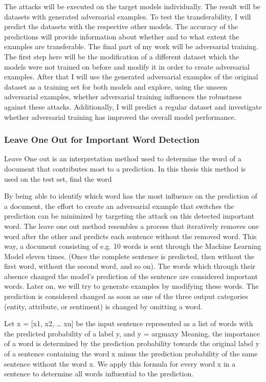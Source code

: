 The attacks will be executed on the target models individually.
The result will be datasets with generated adversarial examples. To test the transferability, I will predict the datasets with the respective other models. The accuracy of the predictions will provide information about whether and to what extent the examples are transferable.
The final part of my work will be adversarial training. 
The first step here will be the modification of a different dataset which the models were not trained on before and modify it in order to create adversarial examples. After that I will use the generated adversarial examples of the original dataset as a training set for both models and explore, using the unseen adversarial examples, whether adversarial training influences the robustness against these attacks. Additionally, I will predict a regular dataset and investigate whether adversarial training has improved the overall model performance.




\subsubsection{Leave One Out for Important Word Detection}

Leave One out is an interpretation method used to determine the word of a document that contributes most to a prediction. 
In this thesis this method is used on the test set, find the word 

By being able to identify which word has the most influence on the prediction of a document, the effort to create an adversarial example that switches the prediction can be minimized by targeting the attack on this detected important word.
The leave one out method resembles a process that iteratively removes one word after the other and predicts each sentence without the removed word. 
This way, a document consisting of e.g. 10 words is sent through the Machine Learning Model eleven times. (Once the complete sentence is predicted, then without the first word, without the second word, and so on).
The words which through their absence changed the model’s prediction of the sentence are considered important words. Later on, we will try to generate examples by modifying these words.
The prediction is considered changed as soon as one of the three output categories (entity, attribute, or sentiment) is changed by omitting a word.

Let x = [x1, x2, … xn] be the input sentence represented as a list of words with the predicted probability of a label y, and y = argmaxy%
Meaning, the importance of a word is determined by the prediction probability towards the original label y of a sentence containing the word x minus the prediction probability of the same sentence without the word x.
We apply this formula for every word x in a sentence to determine all words influential to the prediction. 


